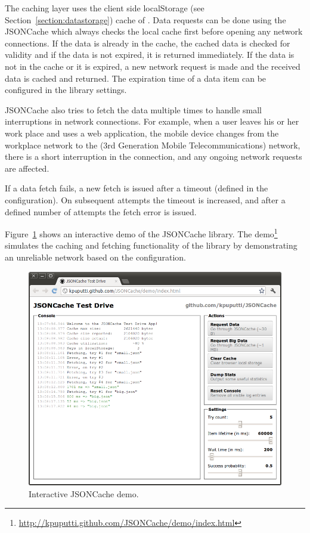 The caching layer uses the client side localStorage (see
Section~\ref{section:datastorage}) cache of . Data
requests can be done using the JSONCache  which always
checks the local cache first before opening any network
connections. If the data is already in the cache, the cached data is
checked for validity and if the data is not expired, it is returned
immediately. If the data is not in the cache or it is expired, a new
network request is made and the received data is cached and
returned. The expiration time of a data item can be configured in the
library settings.

JSONCache also tries to fetch the data multiple times to handle small
interruptions in network connections.  For example, when a user leaves
his or her work place and uses a web application, the mobile device
changes from the workplace  network to the  (3rd
Generation Mobile Telecommunications) network, there is a short
interruption in the connection, and any ongoing network requests are
affected.

If a data fetch fails, a new fetch is issued after a timeout (defined
in the configuration). On subsequent attempts the timeout is
increased, and after a defined number of attempts the fetch error is
issued.

Figure~\ref{figure:jsoncache-demo.png} shows an interactive demo of
the JSONCache library. The
demo\footnote{\url{http://kpuputti.github.com/JSONCache/demo/index.html}}
simulates the caching and fetching functionality of the library by
demonstrating an unreliable network based on the configuration.

\begin{figure}[h!]
  \begin{center}
    \includegraphics[width=\textwidth]{images/jsoncache-demo.png}
    \caption{Interactive JSONCache demo.}
    \label{figure:jsoncache-demo.png}
  \end{center}
\end{figure}

